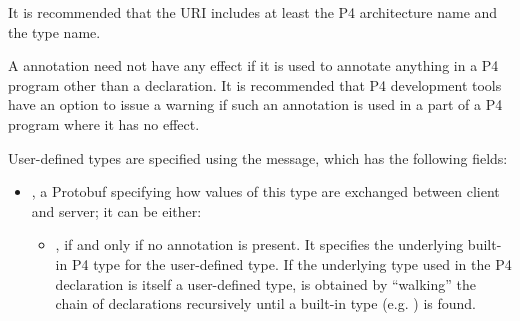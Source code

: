 \documentclass[11pt]{article}
\begin{document}
{%
It is recommended that the URI includes at least the P4 architecture name and
the type name.%

A  annotation need not have any effect if it is used to
annotate anything in a P4 program other than a  declaration. It is
recommended that P4 development tools have an option to issue a warning if such
an annotation is used in a part of a P4 program where it has no effect.%

User-defined types are specified using the  message, which has
the following fields:%

\begin{itemize}%

\item{}
, a Protobuf  specifying how values of this type are
exchanged between client and server; it can be either:%

\begin{itemize}%

\item{}
, if and only if no  annotation is
present. It specifies the underlying built-in P4 type for the user-defined
type. If the underlying type used in the P4  declaration is itself a
user-defined type,  is obtained by \textquotedblleft{}walking\textquotedblright{} the chain of
 declarations recursively until a built-in type (e.g. ) is
found.%


\end{itemize}
\end{itemize}}
\end{document}
